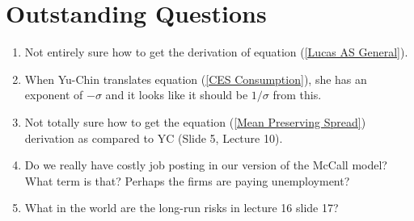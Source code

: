 \documentclass[12pt]{article}
\begin{document}
\section{Outstanding Questions}

\begin{enumerate}
    \item Not entirely sure how to get the derivation of equation (\ref{Lucas AS General}).
    \item When Yu-Chin translates equation (\ref{CES Consumption}), she has an exponent of $-\sigma$ and it looks like it should be $1/\sigma$ from this.
    \item Not totally sure how to get the equation (\ref{Mean Preserving Spread}) derivation as compared to YC (Slide 5, Lecture 10).
    \item Do we really have costly job posting in our version of the McCall model? What term is that? Perhaps the firms are paying unemployment?
    \item What in the world are the long-run risks in lecture 16 slide 17?
\end{enumerate}
\end{document}
